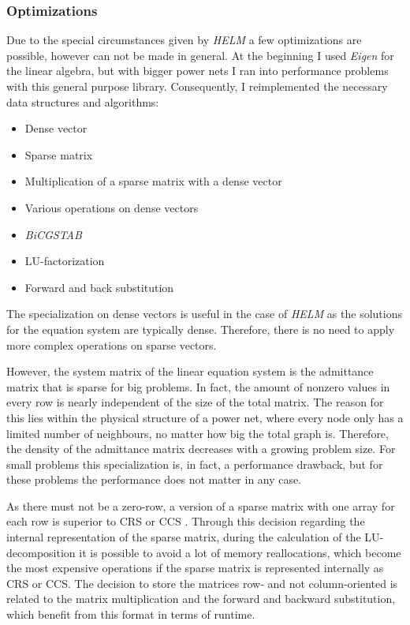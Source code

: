 \subsubsection{Optimizations}
Due to the special circumstances given by \emph{HELM} a few optimizations are possible, however can not be made in general. At the beginning I used \emph{Eigen} for the linear algebra, but with bigger power nets I ran into performance problems with this general purpose library. Consequently, I reimplemented the necessary data structures and algorithms:
\begin{itemize}
	\item Dense vector
	\item Sparse matrix
	\item Multiplication of a sparse matrix with a dense vector
	\item Various operations on dense vectors
	\item \emph{BiCGSTAB}
	\item LU-factorization
	\item Forward and back substitution
\end{itemize}

The specialization on dense vectors is useful in the case of \emph{HELM} as the solutions for the equation system are typically dense. Therefore, there is no need to apply more complex operations on sparse vectors.

However, the system matrix of the linear equation system is the admittance matrix that is sparse for big problems. In fact, the amount of nonzero values in every row is nearly independent of the size of the total matrix. The reason for this lies within the physical structure of a power net, where every node only has a limited number of neighbours, no matter how big the total graph is. Therefore, the density of the admittance matrix decreases with a growing problem size. For small problems this specialization is, in fact, a performance drawback, but for these problems the performance does not matter in any case.

As there must not be a zero-row, a version of a sparse matrix with one array for each row is superior to CRS \cite{sparseMatricesJava} or CCS \cite{sparseMatricesJava}. Through this decision regarding the internal representation of the sparse matrix, during the calculation of the LU-decomposition it is possible to avoid a lot of memory reallocations, which become the most expensive operations if the sparse matrix is represented internally as CRS or CCS. The decision to store the matrices row- and not column-oriented is related to the matrix multiplication and the forward and backward substitution, which benefit from this format in terms of runtime.


